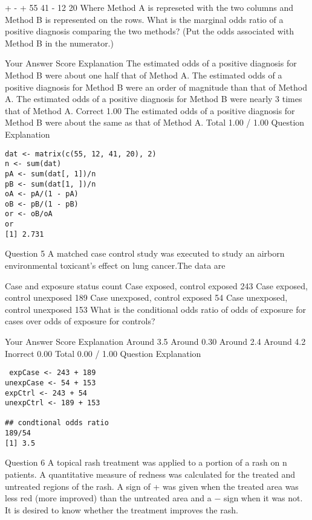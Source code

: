 +	-
+	55	41
-	12	20
Where Method A is represeted with the two columns and Method B is represented on the rows. What is the marginal odds ratio of a positive diagnosis comparing the two methods? (Put the odds associated with Method B in the numerator.)

Your Answer		Score	Explanation
The estimated odds of a positive diagnosis for Method B were about one half that of Method A.			
The estimated odds of a positive diagnosis for Method B were an order of magnitude than that of Method A.			
The estimated odds of a positive diagnosis for Method B were nearly 3 times that of Method A.	Correct	1.00	
The estimated odds of a positive diagnosis for Method B were about the same as that of Method A.			
Total		1.00 / 1.00	
Question Explanation
\begin{framed}
\begin{verbatim}
dat <- matrix(c(55, 12, 41, 20), 2)
n <- sum(dat)
pA <- sum(dat[, 1])/n
pB <- sum(dat[1, ])/n
oA <- pA/(1 - pA)
oB <- pB/(1 - pB)
or <- oB/oA
or
[1] 2.731
\end{verbatim}
\end{framed}
Question 5
A matched case control study was executed to study an airborn environmental toxicant's effect on lung cancer.The data are

Case and exposure status	count
Case exposed, control exposed	243
Case exposed, control unexposed	189
Case unexposed, control exposed	54
Case unexposed, control unexposed	153
What is the conditional odds ratio of odds of exposure for cases over odds of exposure for controls?

Your Answer		Score	Explanation
Around 3.5			
Around 0.30			
Around 2.4			
Around 4.2	Inorrect	0.00	
Total		0.00 / 1.00	
Question Explanation
\begin{framed}
\begin{verbatim}
 expCase <- 243 + 189
unexpCase <- 54 + 153
expCtrl <- 243 + 54
unexpCtrl <- 189 + 153

## condtional odds ratio
189/54
[1] 3.5
\end{verbatim}
\end{framed}
Question 6
A topical rash treatment was applied to a portion of a rash on n patients. A quantitative measure of redness was calculated for the treated and untreated regions of the rash. A sign of + was given when the treated area was less red (more improved) than the untreated area and a − sign when it was not. It is desired to know whether the treatment improves the rash.

